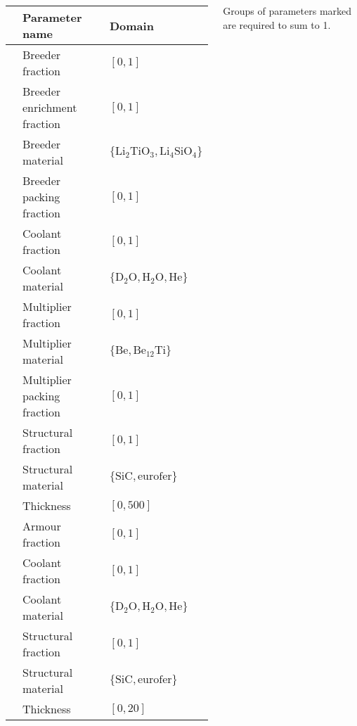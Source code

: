 \begin{frame}
\begin{columns}[T]
		\vspace{5pt}
		{\fontsize{8pt}{8pt}\selectfont
		\setlength\tabcolsep{3pt}
		\begin{tabular}{l|ll}
		\toprule
		{} & Parameter name & Domain\\
		\midrule
		\parbox[t]{2mm}{\hspace{-2pt}}
		   & Breeder fraction\textsuperscript{\textdagger} & $[0,1]$\\
		   & Breeder  enrichment fraction & $[0,1]$\\
		   & Breeder material & $\{\text{Li}_2\text{TiO}_3, \text{Li}_4\text{SiO}_4\}$\\
		   & Breeder packing fraction & $[0,1]$\\
		   & Coolant fraction\textsuperscript{\textdagger} & $[0,1]$\\
		   & Coolant material & $\{\text{D}_2\text{O}, \text{H}_2\text{O}, \text{He}\}$\\
		   & Multiplier fraction\textsuperscript{\textdagger} & $[0,1]$\\
		   & Multiplier material & $\{\text{Be}, \text{Be}_{12}\text{Ti}\}$\\
		   & Multiplier packing fraction & $[0,1]$\\
		   & Structural fraction\textsuperscript{\textdagger} & $[0,1]$\\
		   & Structural material & $\{\text{SiC}, \text{eurofer}\}$\\
		   & Thickness & $[0,500]$\\
		\midrule
		\parbox[t]{2mm}{\hspace{-2pt}}
		   & Armour fraction\textsuperscript{\textdaggerdbl} & $[0,1]$\\
		   & Coolant fraction\textsuperscript{\textdaggerdbl} & $[0,1]$\\
		   & Coolant material & $\{\text{D}_2\text{O}, \text{H}_2\text{O}, \text{He}\}$\\
		   & Structural fraction\textsuperscript{\textdaggerdbl} & $[0,1]$\\
		   & Structural material & $\{\text{SiC}, \text{eurofer}\}$\\
		   & Thickness & $[0,20]$\\
		\bottomrule
		\end{tabular}
		}

		{\tiny
		Groups of parameters marked\textsuperscript{\textdagger\textdaggerdbl}
		are required to sum to 1.
		}

    \end{columns}
\end{frame}

